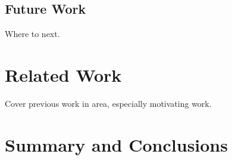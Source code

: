 \documentclass{sig-alternate}
\begin{document}
\subsection{Future Work}
Where to next.

\section{Related Work}
Cover previous work in area, especially motivating work.

\section{Summary and Conclusions}




\end{document}
